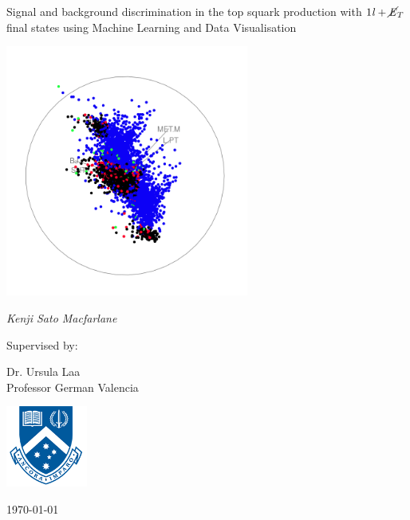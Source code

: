 \documentclass[12pt,a4paper]{report}
\begin{document}
\begin{titlepage}


				\centering

				{\Large{}\selectfont Signal and background discrimination in the top squark production with   $\text{1\textit{l}} + \cancel{\it{E}}_{T} $ final states using Machine Learning and Data Visualisation \par}
				\vspace{1.0cm}
			    \includegraphics[width=0.6\textwidth]{title.png}\par\vspace{1cm}
				{\Large\itshape Kenji Sato Macfarlane\par}
				\vfill
				Supervised by:\par
				Dr. Ursula Laa \\ Professor German Valencia 
				
				\vfill
				\includegraphics[width=0.2\textwidth]{monashlogo.png}\par\vspace{0.5cm}
				
				{\large \today\par}

\end{titlepage}
\end{document}
